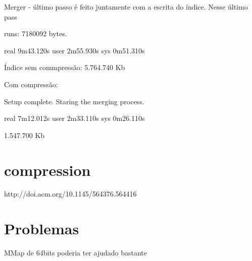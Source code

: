 Merger - último passo é feito juntamente com a escrita do índice.
Nesse último pass

runs: 7180092 bytes.

real    9m43.120s
user    2m55.930s
sys     0m51.310s

Índice sem commpressão: 5.764.740 Kb

Com compressão:

Setup complete. Staring the merging process.

real    7m12.012s
user    2m33.110s
sys     0m26.110s

1.547.700 Kb


\section{compression}

http://doi.acm.org/10.1145/564376.564416

\section{Problemas}

MMap de 64bits poderia ter ajudado bastante

